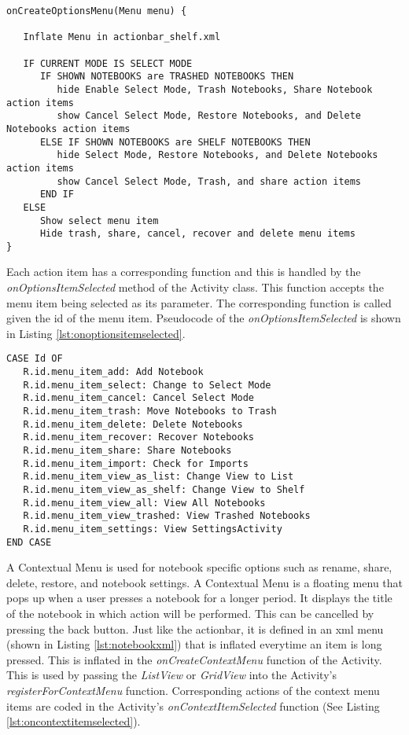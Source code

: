 \begin{lstlisting}[frame=single, label=lst:oncreateoptionsmenu, caption=Pseudocode of \textit{onCreateOptionsMenu} function]
onCreateOptionsMenu(Menu menu) {

   Inflate Menu in actionbar_shelf.xml

   IF CURRENT MODE IS SELECT MODE
      IF SHOWN NOTEBOOKS are TRASHED NOTEBOOKS THEN
         hide Enable Select Mode, Trash Notebooks, Share Notebook action items
		 show Cancel Select Mode, Restore Notebooks, and Delete Notebooks action items
	  ELSE IF SHOWN NOTEBOOKS are SHELF NOTEBOOKS THEN 
		 hide Select Mode, Restore Notebooks, and Delete Notebooks action items
		 show Cancel Select Mode, Trash, and share action items
	  END IF
   ELSE
	  Show select menu item
	  Hide trash, share, cancel, recover and delete menu items
}
\end{lstlisting}



Each action item has a corresponding function and this is handled by the \textit{onOptionsItemSelected} method of the Activity class. This function accepts the menu item being selected as its parameter. The corresponding function is called given the id of the menu item. Pseudocode of the \textit{onOptionsItemSelected} is shown in Listing \ref{lst:onoptionsitemselected}.

\begin{lstlisting}[frame=single, label=lst:onoptionsitemselected, caption=\textit{onOptionsItemSelected} pseudocode]
CASE Id OF
   R.id.menu_item_add: Add Notebook
   R.id.menu_item_select: Change to Select Mode
   R.id.menu_item_cancel: Cancel Select Mode
   R.id.menu_item_trash: Move Notebooks to Trash
   R.id.menu_item_delete: Delete Notebooks
   R.id.menu_item_recover: Recover Notebooks
   R.id.menu_item_share: Share Notebooks
   R.id.menu_item_import: Check for Imports
   R.id.menu_item_view_as_list: Change View to List
   R.id.menu_item_view_as_shelf: Change View to Shelf
   R.id.menu_item_view_all: View All Notebooks
   R.id.menu_item_view_trashed: View Trashed Notebooks
   R.id.menu_item_settings: View SettingsActivity
END CASE
\end{lstlisting}

A Contextual Menu is used for notebook specific options such as rename, share, delete, restore, and notebook settings. A Contextual Menu is a floating menu that pops up when a user presses a notebook for a longer period. It displays the title of the notebook in which action will be performed. This can be cancelled by pressing the back button. Just like the actionbar, it is defined in an xml menu (shown in Listing \ref{lst:notebookxml}) that is inflated everytime an item is long pressed. This is inflated in the \textit{onCreateContextMenu} function of the Activity. This is used by passing the \textit{ListView} or \textit{GridView} into the Activity's \textit{registerForContextMenu} function. Corresponding actions of the context menu items are coded in the Activity's \textit{onContextItemSelected} function (See Listing \ref{lst:oncontextitemselected}). 

